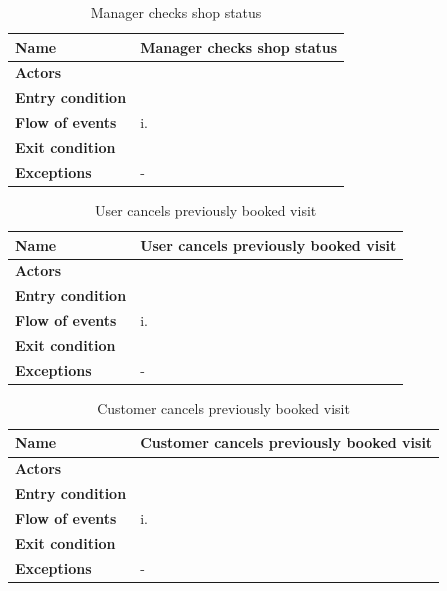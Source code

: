 \begin{table}[h!]
    \centering
    \begin{tabular}{@{}P{0.2\textwidth}P{0.70\textwidth}@{}}
        \toprule
        \textbf{Name}                 & Manager checks shop status\\
        \midrule
        \textbf{Actors}               & \\
        \textbf{Entry condition}      & \\
        \textbf{Flow of events}            
        & i.\\
        \textbf{Exit condition}       & \\
        \textbf{Exceptions}           
        & - \\
        \bottomrule
    \end{tabular}
\caption{Manager checks shop status}
\label{table:managerchecksshopstatus}
\end{table}

\begin{table}[h!]
    \centering
    \begin{tabular}{@{}P{0.2\textwidth}P{0.70\textwidth}@{}}
        \toprule
        \textbf{Name}                 & User cancels previously booked visit\\
        \midrule
        \textbf{Actors}               & \\
        \textbf{Entry condition}      & \\
        \textbf{Flow of events}            
        & i.\\
        \textbf{Exit condition}       & \\
        \textbf{Exceptions}           
        & - \\
        \bottomrule
    \end{tabular}
\caption{User cancels previously booked visit}
\label{table:usercancelspreviouslybookedvisit}
\end{table}

\begin{table}[h!]
    \centering
    \begin{tabular}{@{}P{0.2\textwidth}P{0.70\textwidth}@{}}
        \toprule
        \textbf{Name}                 & Customer cancels previously booked visit\\
        \midrule
        \textbf{Actors}               & \\
        \textbf{Entry condition}      & \\
        \textbf{Flow of events}            
        & i.\\
        \textbf{Exit condition}       & \\
        \textbf{Exceptions}           
        & - \\
        \bottomrule
    \end{tabular}
\caption{Customer cancels previously booked visit}
\label{table:customercancelspreviouslybookedvisit}
\end{table}

